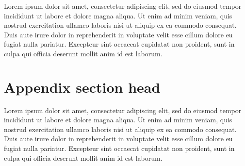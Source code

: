 \documentclass[prodmode,acmtecs]{acmsmall}
\begin{document}
Lorem ipsum dolor sit amet, consectetur adipiscing elit, sed do eiusmod tempor incididunt ut labore et dolore magna aliqua.
Ut enim ad minim veniam, quis nostrud exercitation ullamco laboris nisi ut aliquip ex ea commodo consequat.
Duis aute irure dolor in reprehenderit in voluptate velit esse cillum dolore eu fugiat nulla pariatur.
Excepteur sint occaecat cupidatat non proident, sunt in culpa qui officia deserunt mollit anim id est laborum.

\section{Appendix section head}

Lorem ipsum dolor sit amet, consectetur adipiscing elit, sed do eiusmod tempor incididunt ut labore et dolore magna aliqua.
Ut enim ad minim veniam, quis nostrud exercitation ullamco laboris nisi ut aliquip ex ea commodo consequat.
Duis aute irure dolor in reprehenderit in voluptate velit esse cillum dolore eu fugiat nulla pariatur.
Excepteur sint occaecat cupidatat non proident, sunt in culpa qui officia deserunt mollit anim id est laborum.
\end{document}
